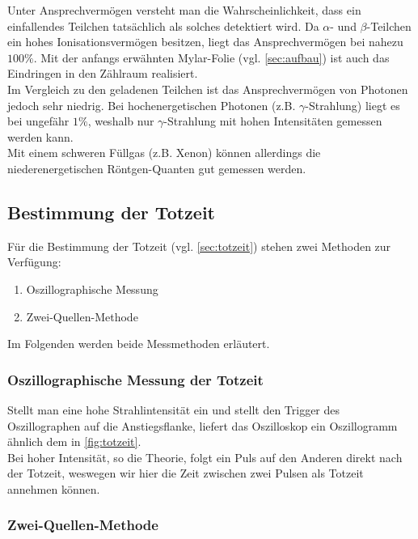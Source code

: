 Unter Ansprechvermögen versteht man die Wahrscheinlichkeit, dass ein einfallendes Teilchen tatsächlich als solches 
detektiert wird. Da $\alpha$- und $\beta$-Teilchen ein hohes Ionisationsvermögen besitzen, liegt das Ansprechvermögen
bei nahezu $100\%$. Mit der anfangs erwähnten Mylar-Folie (vgl. \autoref{sec:aufbau}) ist auch das Eindringen in
den Zählraum realisiert.
\\
Im Vergleich zu den geladenen Teilchen ist das Ansprechvermögen von Photonen jedoch sehr niedrig. Bei hochenergetischen
Photonen (z.B. $\gamma$-Strahlung) liegt es bei ungefähr $1\%$, weshalb nur $\gamma$-Strahlung mit hohen
Intensitäten gemessen werden kann.
\\
Mit einem schweren Füllgas (z.B. Xenon) können allerdings die niederenergetischen Röntgen-Quanten gut gemessen werden.

\subsection{Bestimmung der Totzeit}
\label{sec:bestimmung-totzeit}

Für die Bestimmung der Totzeit (vgl. \autoref{sec:totzeit}) stehen zwei Methoden zur Verfügung:
\begin{enumerate}
	\item Oszillographische Messung
	\item Zwei-Quellen-Methode
\end{enumerate}
Im Folgenden werden beide Messmethoden erläutert.

\subsubsection{Oszillographische Messung der Totzeit}
\label{sec:theo:oszillographisch}

Stellt man eine hohe Strahlintensität ein und stellt den Trigger des Oszillographen auf die Anstiegsflanke, liefert
das Oszilloskop ein Oszillogramm ähnlich dem in \autoref{fig:totzeit}.
\\
Bei hoher Intensität, so die Theorie, folgt ein Puls auf den Anderen direkt nach der Totzeit, weswegen wir hier die
Zeit zwischen zwei Pulsen als Totzeit annehmen können.

\subsubsection{Zwei-Quellen-Methode}
\label{sec:theo:zwei-quellen}

